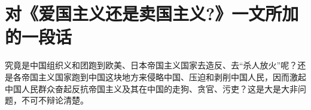 \section[对《爱国主义还是卖国主义?》一文所加的一段话（一九六七年四月）]{对《爱国主义还是卖国主义?》一文所加的一段话}


究竟是中国组织义和团跑到欧美、日本帝国主义国家去造反、去“杀人放火”呢？还是各帝国主义国家跑到中国这块地方来侵略中国、压迫和剥削中国人民，因而激起中国人民群众奋起反抗帝国主义及其在中国的走狗、贪官、污吏？这是大是大非问题，不可不辩论清楚。

